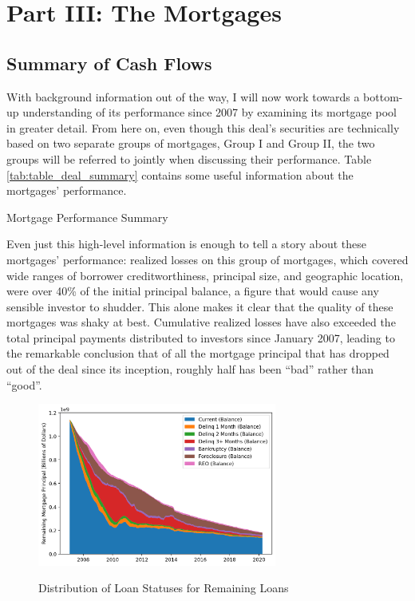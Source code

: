 \documentclass[12pt]{article}
\begin{document}
\section*{Part III: The Mortgages}
\subsection*{Summary of Cash Flows}

With background information out of the way, I will now work towards a bottom-up understanding of its performance since 2007 by examining its mortgage pool in greater detail. From here on, even though this deal’s securities are technically based on two separate groups of mortgages, Group I and Group II, the two groups will be referred to jointly when discussing their performance. Table \ref{tab:table_deal_summary} contains some useful information about the mortgages’ performance.

\begin{table}[h]
	\centering
	
	\caption{Mortgage Performance Summary}
	\label{tab:table_deal_summary}
\end{table}

Even just this high-level information is enough to tell a story about these mortgages’ performance: realized losses on this group of mortgages, which covered wide ranges of borrower creditworthiness, principal size, and geographic location, were over 40\% of the initial principal balance, a figure that would cause any sensible investor to shudder. This alone makes it clear that the quality of these mortgages was shaky at best. Cumulative realized losses have also exceeded the total principal payments distributed to investors since January 2007, leading to the remarkable conclusion that of all the mortgage principal that has dropped out of the deal since its inception, roughly half has been “bad” rather than “good”.

\begin{figure}[h]
	\centering
	\caption{Distribution of Loan Statuses for Remaining Loans}
	\includegraphics[width=0.7\textwidth]{../figures/stackplot_delinq_status}
	\label{fig:stackplot_delinq_status}
\end{figure}
\end{document}
